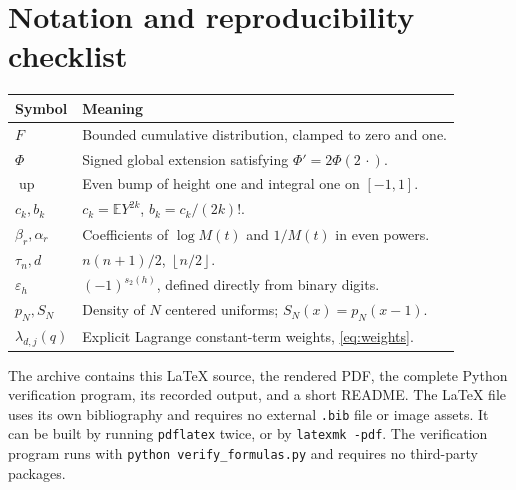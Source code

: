 \documentclass[11pt,a4paper]{article}
\theoremstyle{definition}
\theoremstyle{remark}
\newcommand{\Up}{\operatorname{up}}
\newcommand{\E}{\mathbb E}
\newcommand{\eps}{\varepsilon}
\newcommand{\floor}[1]{\left\lfloor #1\right\rfloor}
\begin{document}
\section{Notation and reproducibility checklist}
\begin{center}
\renewcommand{\arraystretch}{1.22}
\begin{tabularx}{\textwidth}{@{}lX@{}}
\toprule
Symbol&Meaning\\
\midrule
\(F\)&Bounded cumulative distribution, clamped to zero and one.\\
\(\Phi\)&Signed global extension satisfying \(\Phi'=2\Phi(2\,\cdot)\).\\
\(\Up\)&Even bump of height one and integral one on \([-1,1]\).\\
\(c_k, b_k\)&\(c_k=\E Y^{2k}\), \(b_k=c_k/(2k)!\).\\
\(\beta_r,\alpha_r\)&Coefficients of \(\log M(t)\) and \(1/M(t)\) in even powers.\\
\(\tau_n,d\)&\(n(n+1)/2\), \(\floor{n/2}\).\\
\(\eps_h\)&\((-1)^{s_2(h)}\), defined directly from binary digits.\\
\(p_N,S_N\)&Density of \(N\) centered uniforms; \(S_N(x)=p_N(x-1)\).\\
\(\lambda_{d,j}(q)\)&Explicit Lagrange constant-term weights, \eqref{eq:weights}.\\
\bottomrule
\end{tabularx}
\end{center}

The archive contains this \LaTeX{} source, the rendered PDF, the complete Python
verification program, its recorded output, and a short README.  The \LaTeX{} file
uses its own bibliography and requires no external \texttt{.bib} file or image
assets.  It can be built by running \texttt{pdflatex} twice, or by
\texttt{latexmk -pdf}.  The verification program runs with
\texttt{python verify\_formulas.py} and requires no third-party packages.
\end{document}
